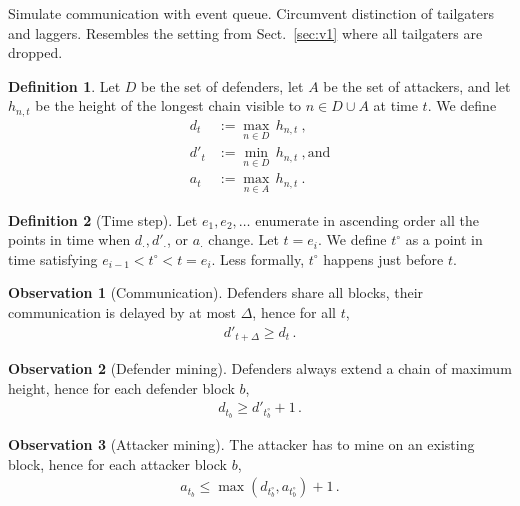 \documentclass[12pt]{article}
\theoremstyle{definition}
\newtheorem{definition}{Definition}
\newtheorem{observation}{Observation}
\begin{document}
Simulate communication with event queue. Circumvent distinction of tailgaters and laggers.
Resembles the setting from Sect.~\ref{sec:v1} where all tailgaters are dropped.

\begin{definition} \label{def:ts}
  Let $D$ be the set of defenders,
  let $A$ be the set of attackers, and
  let $h_{n,t}$ be the height of the longest chain visible to $n \in D \cup A$ at time $t$.
  We define
  \begin{align}
    d_t & := \max_{n \in D} \, h_{n, t} ~,\\
    d'_t & := \min_{n \in D} \, h_{n, t} ~, \text{and}\\
    a_t & := \max_{n \in A} \, h_{n, t} ~.
  \end{align}
\end{definition}

\newcommand{\justbefore}[1]{{#1^{\circ}}}

\begin{definition}[Time step]
  Let $e_1, e_2, \dots$ enumerate in ascending order all the points in time when $d_\cdot, d'_\cdot$, or $a_\cdot$ change.
  Let $t = e_i$. We define $\justbefore{t}$ as a point in time satisfying $e_{i-1} < \justbefore{t} < t =  e_i$.
  Less formally, $\justbefore{t}$ happens just before $t$.
\end{definition}

\begin{observation}[Communication] \label{obs:communication}
  Defenders share all blocks, their communication is delayed by at most $\Delta$, hence for all $t$,
  \begin{align}
    d'_{t + \Delta} \geq d_t \,.
  \end{align}
\end{observation}

\begin{observation}[Defender mining] \label{obs:defendermining}
  Defenders always extend a chain of maximum height, hence for each defender block $b$,
  \begin{align}
    d_{t_b} \geq d'_\justbefore{t_b} + 1\,.
  \end{align}
\end{observation}

\begin{observation}[Attacker mining] \label{obs:attackermining}
  The attacker has to mine on an existing block, hence for each attacker block $b$,
  \begin{align}
    a_{t_b} \leq \max\left(d_\justbefore{t_b}, a_\justbefore{t_{b}}\right) + 1\,.
  \end{align}
\end{observation}
\end{document}

